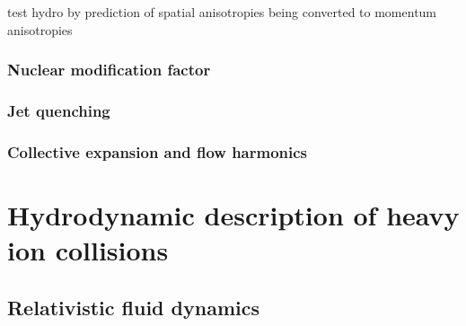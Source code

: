 test hydro by prediction of spatial anisotropies being converted to momentum anisotropies

\subsubsection{Nuclear modification factor}
\subsubsection{Jet quenching}
\subsubsection{Collective expansion and flow harmonics}


\section{Hydrodynamic description of heavy ion collisions}

\subsection{Relativistic fluid dynamics}

